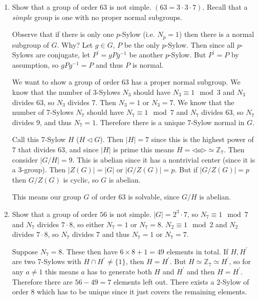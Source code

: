 \documentclass{article}
\begin{document}
\begin{xmpl}
\begin{enumerate}
  \item{
    Show that a group of order 63 is not simple. 
    $(63 = 3 \cdot 3 \cdot 7)$. Recall that a \emph{simple} group is
    one with no proper normal subgroups.

    Observe that if there is only one $p$-Sylow (i.e. $N_p = 1$) then
    there is a normal subgroup of $G$. Why? Let $g \in G$, $P$ be
    the only $p$-Sylow. Then since all $p$-Sylows are conjugate, let
    $P^\prime = gPg^{-1}$ be another $p$-Sylow. But $P^\prime = P$ by
    assumption, so $gPg^{-1} = P$ and thus $P$ is normal.

    We want to show a group of order 63 has a proper normal subgroup.
    We know that the number of 3-Sylows $N_3$ should have
    $N_3 \equiv 1 \mod 3$ and $N_3$ divides 63, so $N_3$ divides
    7. Then $N_3 = 1$ or $N_3 = 7$. We know that the number of
    7-Sylows $N_7$ should have $N_7 \equiv 1 \mod 7$ and $N_7$ divides
    63, so $N_7$ divides 9, and thus $N_7 = 1$. Therefore there is a
    unique 7-Sylow normal in $G$.

    Call this 7-Sylow $H$ ($H \triangleleft G$). Then $|H| = 7$ since
    this is the highest power of $7$ that divides 63, and since $|H|$
    is prime this means 
    $H = \triangleleft a \triangleright \simeq \mathbb{Z}_7$. Then
    consider $|G / H| = 9$. This is abelian since it has a nontrivial
    center (since it is a $3$-group). 
    Then $|Z(G)| = |G|$ or $|G / Z(G)| = p$. But if $|G / Z(G)| = p$ then
    $G / Z(G)$ is cyclic, so $G$ is abelian.

    This means our group $G$ of order 63 is solvable, since $G / H$ is abelian.
  }
  \item{
    Show that a group of order $56$ is not simple.
    $|G| = 2^3 \cdot 7$, so $N_7 \equiv 1 \mod 7$ and $N_7$ divides $7
    \cdot 8$, so either $N_7 = 1$ or $N_7 = 8$. $N_2 \equiv 1 \mod 2$
    and $N_2$ divides $7 \cdot 8$, so $N_7$ divides 7 and thus $N_7 =
    1$ or $N_7 = 7$.

    Suppose $N_7 = 8$. These then have $6 \times 8 + 1 = 49$ elements
    in total. If $H, H^\prime$ are two 7-Sylows with $H \cap H^\prime
    \neq \{ 1 \}$, then $H = H^\prime$. But $H \simeq \mathbb{Z}_7
    \simeq H^\prime$, so for any $a \neq 1$ this means $a$ has to
    generate both $H$ and $H^\prime$ and then $H =
    H^\prime$. Therefore there are $56 - 49 = 7$ elements left
    out. There exists a 2-Sylow of order 8 which has to be unique
    since it just covers the remaining elements.

}
\end{enumerate}
\end{xmpl}
\end{document}
